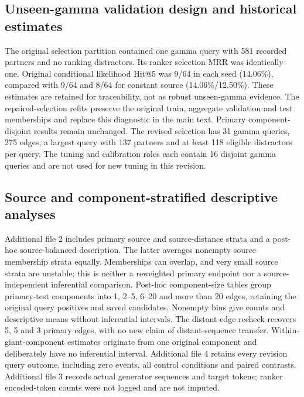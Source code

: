 \documentclass[11pt]{article}
\begin{document}
\subsection{Unseen-gamma validation design and historical estimates}
The original selection partition contained one gamma query with 581 recorded
partners and no ranking distractors. Its ranker selection MRR was identically
one. Original conditional likelihood Hit@5 was 9/64 in each seed (14.06\%),
compared with 9/64 and 8/64 for constant source (14.06\%/12.50\%). These
estimates are retained for traceability, not as robust unseen-gamma evidence.
The repaired-selection refits preserve the original train, aggregate validation
and test memberships and replace this diagnostic in the main text. Primary
component-disjoint results remain unchanged. The revised selection has 31
gamma queries, 275 edges, a largest query with 137 partners and at least 118
eligible distractors per query. The tuning and calibration roles each contain
16 disjoint gamma queries and are not used for new tuning in this revision.

\subsection{Source and component-stratified descriptive analyses}
Additional file 2 includes primary source and source-distance strata and a
post-hoc source-balanced description. The latter averages nonempty source
membership strata equally. Memberships can overlap, and very small source
strata are unstable; this is neither a reweighted primary endpoint nor a
source-independent inferential comparison. Post-hoc component-size tables group
primary-test components into 1, 2--5, 6--20 and more than 20 edges, retaining
the original query positives and saved candidates. Nonempty bins give counts
and descriptive means without inferential intervals. The distant-edge recheck recovers
5, 5 and 3 primary edges, with no new claim of distant-sequence transfer.
Within-giant-component estimates originate from one original component and
deliberately have no inferential interval. Additional file 4 retains every
revision query outcome, including zero events, all control conditions and
paired contrasts. Additional file 3 records actual generator sequences and
target tokens; ranker encoded-token counts were not logged and are not imputed.
\end{document}
